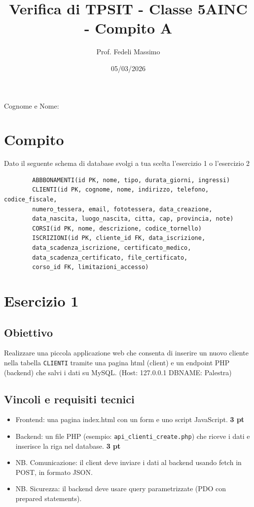 \documentclass[a4paper,12pt]{article}
\title{Verifica di TPSIT -  Classe 5AINC - Compito A}
\author{Prof. Fedeli Massimo}
\date{05/03/2026}
\begin{document}
	\maketitle
	Cognome e Nome: 
\vspace{1cm  }
	\section*{Compito}
    Dato il seguente schema di database svolgi a tua scelta l'esercizio 1 o l'esercizio 2
	
	\begin{verbatim}
		ABBBONAMENTI(id PK, nome, tipo, durata_giorni, ingressi)
		CLIENTI(id PK, cognome, nome, indirizzo, telefono, codice_fiscale,
		numero_tessera, email, fototessera, data_creazione,
		data_nascita, luogo_nascita, citta, cap, provincia, note)
		CORSI(id PK, nome, descrizione, codice_tornello)
		ISCRIZIONI(id PK, cliente_id FK, data_iscrizione,
		data_scadenza_iscrizione, certificato_medico,
		data_scadenza_certificato, file_certificato,
		corso_id FK, limitazioni_accesso)
	\end{verbatim}
	
	\section*{Esercizio 1}
	
	\subsection*{Obiettivo}
	
	Realizzare una piccola applicazione web che consenta di inserire un nuovo cliente nella tabella \texttt{CLIENTI} tramite una pagina html (client) e un endpoint PHP (backend) che salvi i dati su MySQL. (Host: 127.0.0.1  DBNAME: Palestra)
	
	\subsection*{Vincoli e requisiti tecnici}
	
	\begin{itemize}
		\item Frontend: una pagina index.html con un form e uno script JavaScript. \textbf{3 pt}
		\item Backend: un file PHP (esempio: \texttt{api\_clienti\_create.php}) che riceve i dati e inserisce la riga nel database. \textbf{3 pt}
		\item NB. Comunicazione: il client deve inviare i dati al backend usando fetch in POST, in formato JSON.
		\item NB. Sicurezza: il backend deve usare query parametrizzate (PDO con prepared statements). 
	\end{itemize}
	
\end{document}
